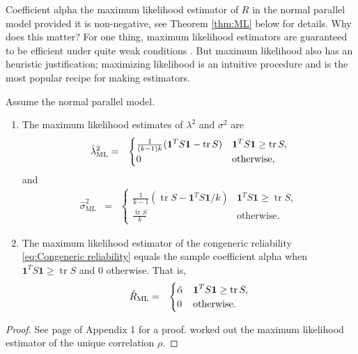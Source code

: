 \documentclass[twoside]{article}
\DeclareMathOperator{\tr}{tr}
\begin{document}
Coefficient alpha the maximum likelihood estimator of $ R$ in the normal parallel model provided it is non-negative, see Theorem \ref{thm:ML} below for details. Why does this matter? For one thing, maximum likelihood estimators are guaranteed to be efficient under quite weak conditions \citep[][Section 7.3]{Lehmann2004-ke}. But maximum likelihood also has an heuristic justification; maximizing likelihood is an intuitive procedure and is the most popular recipe for making estimators.

\begin{thm}\label{thm:ML}
Assume the normal parallel model.
\begin{enumerate}[label=(\roman*)]
\item The maximum likelihood estimates of $\lambda^{2}$
and $\sigma^{2}$ are 
\begin{eqnarray*}
\hat{\lambda}^2_\textrm{ML} & = & \begin{cases}
\frac{1}{(k-1)k}(\boldsymbol{1}^{T}S\boldsymbol{1}-\tr{S}) & \boldsymbol{1}^{T}S\boldsymbol{1}\geq\tr{S},\\
0 & \text{\textrm{otherwise}},
\end{cases}\\
\end{eqnarray*}
and
\begin{eqnarray*}
\hat{\sigma}^2_\textrm{ML} & = & \begin{cases}
\frac{1}{k-1}(\tr{S}-\boldsymbol{1}^{T}S\boldsymbol{1}/k) & \boldsymbol{1}^{T}S\boldsymbol{1}\geq\tr{S},\\
\frac{\tr{S}}{k} & \textrm{otherwise}.
\end{cases}
\end{eqnarray*}
\item The maximum likelihood estimator of the congeneric reliability
\eqref{eq:Congeneric reliability} equals the sample coefficient alpha
when $\boldsymbol{1}^{T}S\boldsymbol{1}\geq\tr{S}$ and $0$ otherwise. That is,
\begin{eqnarray*}
\hat{ R}_\textrm{ML} & = & \begin{cases}
\hat{\alpha} & \boldsymbol{1}^{T}S\boldsymbol{1}\geq\tr{S},\\
0 & \text{\textrm{otherwise}}.
\end{cases}
\end{eqnarray*}
\end{enumerate}
\end{thm}
\begin{proof}
See page \pageref{proof:ML} of Appendix 1 for a proof. \citet[][section B]{Kristof1963-tb} worked out the maximum likelihood estimator of the unique correlation $\rho$. 
\end{proof}
\end{document}

